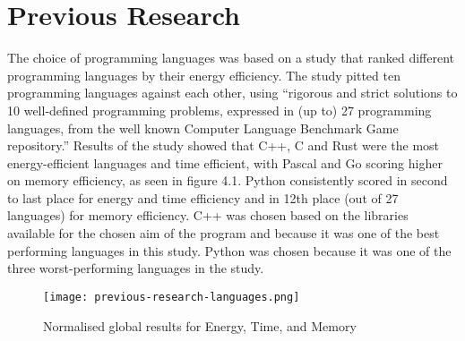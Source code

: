\chapter{Previous Research}
The choice of programming languages was based on a study that ranked different programming languages by their energy efficiency. The study pitted ten programming languages against each other, using “rigorous and strict solutions to 10 well-defined programming problems, expressed in (up to) 27 programming languages, from the well known Computer Language Benchmark Game repository.” \cite[abstract]{PEREIRA2021102609} Results of the study showed that C++, C and Rust were the most energy-efficient languages and time efficient, with Pascal and Go scoring higher on memory efficiency, as seen in figure 4.1. Python consistently scored in second to last place for energy and time efficiency and in 12th place (out of 27 languages) for memory efficiency.
C++ was chosen based on the libraries available for the chosen aim of the program and because it was one of the best performing languages in this study.
Python was chosen because it was one of the three worst-performing languages in the study.

\begin{figure}[htbp]
	\centering
	\texttt{[image: previous-research-languages.png]}
	\caption{Normalised global results for Energy, Time, and Memory \cite[p.16]{PEREIRA2021102609}}
	\label{figure:previous-research-languages}
\end{figure}
